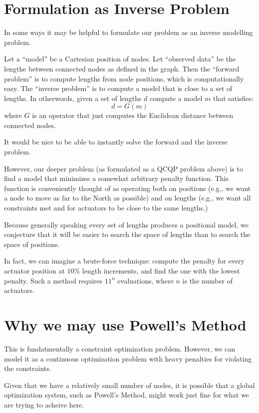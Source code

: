 \documentclass[11pt]{article}
\begin{document}
\section{Formulation as Inverse Problem}

In some ways it may be helpful to formulate our problem as an inverse modelling problem.

Let a ``model'' be a Cartesian position of nodes. Let ``observed data'' be the lengthe
between connected nodes as defined in the graph. Then the ``forward problem'' is
to compute lengths from node positions, which is computationally easy. The ``inverse
problem'' is to compute a model that is close to a set of lengths. In otherwords,
given a set of lengths $d$ compute a model $m$ that satisfies:
\[
 d = G(m)
 \]
 where $G$ is an operator that just computes the Euclidean distance between connected nodes.

 It would be nice to be able to instantly solve the forward and the inverse problem.

 However, our deeper problem (as formulated as a QCQP problem above) is to
 find a model that minimizes a somewhat arbitrary penalty function.  This function
 is conveniently thought of as operating both on positions (e.g., we want a node
 to move as far to the North as possible) and on lengths (e.g., we want all constraints
 met and for actuators to be close to the same lengths.)

 Because generally speaking every set of lengths produces a positional model, we
 conjecture that it will be easier to search the space of lengths than to search
 the space of positions.

 In fact, we can imagine a brute-force technique: compute the penalty for
 every actuator position at $10\%$ length increments, and find the one with
 the lowest penalty.  Such a method requires $11^n$ evaluations, where $n$ is
 the number of actuators.

\section{Why we may use Powell's Method}

This is fundatmentally a constraint optimization problem. However, we can model it as a continuous
optimization problem with heavy penalties for violating the constraints.

Given that we have a relatively small number of nodes, it is possible that a global optimization
system, such as Powell's Method, might work just fine for what we are trying to acheive here.
\end{document}
